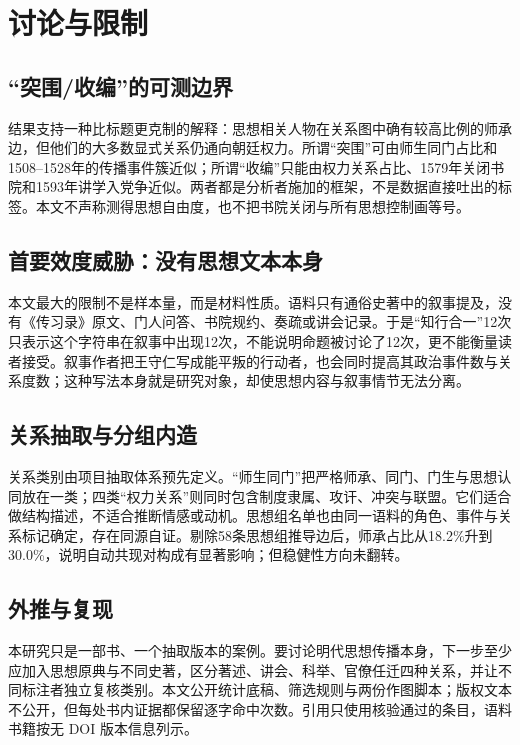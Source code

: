 \section{讨论与限制}

\subsection{“突围/收编”的可测边界}

结果支持一种比标题更克制的解释：思想相关人物在关系图中确有较高比例的师承边，但他们的大多数显式关系仍通向朝廷权力。所谓“突围”可由师生同门占比和1508--1528年的传播事件簇近似；所谓“收编”只能由权力关系占比、1579年关闭书院和1593年讲学入党争近似。两者都是分析者施加的框架，不是数据直接吐出的标签。本文不声称测得思想自由度，也不把书院关闭与所有思想控制画等号。

\subsection{首要效度威胁：没有思想文本本身}

本文最大的限制不是样本量，而是材料性质。语料只有通俗史著中的叙事提及，没有《传习录》原文、门人问答、书院规约、奏疏或讲会记录。于是“知行合一”12次只表示这个字符串在叙事中出现12次，不能说明命题被讨论了12次，更不能衡量读者接受。叙事作者把王守仁写成能平叛的行动者，也会同时提高其政治事件数与关系度数；这种写法本身就是研究对象，却使思想内容与叙事情节无法分离。

\subsection{关系抽取与分组内造}

关系类别由项目抽取体系预先定义。“师生同门”把严格师承、同门、门生与思想认同放在一类；四类“权力关系”则同时包含制度隶属、攻讦、冲突与联盟。它们适合做结构描述，不适合推断情感或动机。思想组名单也由同一语料的角色、事件与关系标记确定，存在同源自证。剔除58条思想组推导边后，师承占比从18.2\%升到30.0\%，说明自动共现对构成有显著影响；但稳健性方向未翻转。

\subsection{外推与复现}

本研究只是一部书、一个抽取版本的案例。要讨论明代思想传播本身，下一步至少应加入思想原典与不同史著，区分著述、讲会、科举、官僚任迁四种关系，并让不同标注者独立复核类别。本文公开统计底稿、筛选规则与两份作图脚本；版权文本不公开，但每处书内证据都保留逐字命中次数。引用只使用核验通过的条目，语料书籍按无 DOI 版本信息列示。
